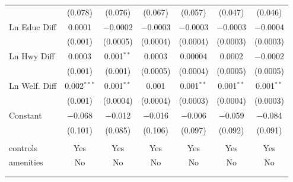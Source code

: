 \begin{table}[!htbp]
\begin{tabular}{@{\extracolsep{5pt}}lcccccc}
  & (0.078) & (0.076) & (0.067) & (0.057) & (0.047) & (0.046) \\ 
  Ln Educ Diff & 0.0001 & $-$0.0002 & $-$0.0003 & $-$0.0003 & $-$0.0003 & $-$0.0004 \\ 
  & (0.001) & (0.0005) & (0.0004) & (0.0004) & (0.0003) & (0.0003) \\ 
  Ln Hwy Diff & 0.0003 & 0.001$^{**}$ & 0.0003 & 0.00004 & 0.0002 & $-$0.0002 \\ 
  & (0.001) & (0.001) & (0.0005) & (0.0004) & (0.0005) & (0.0005) \\ 
  Ln Welf. Diff & 0.002$^{***}$ & 0.001$^{**}$ & 0.001 & 0.001$^{**}$ & 0.001$^{**}$ & 0.001$^{**}$ \\ 
  & (0.001) & (0.0004) & (0.0004) & (0.0003) & (0.0004) & (0.0003) \\ 
  Constant & $-$0.068 & $-$0.012 & $-$0.016 & $-$0.006 & $-$0.059 & $-$0.084 \\ 
  & (0.101) & (0.085) & (0.106) & (0.097) & (0.092) & (0.091) \\ 
 \hline \\[-1.8ex] 
controls & Yes & Yes & Yes & Yes & Yes & Yes \\ 
amenities & No & No & No & No & No & No \\ 
\hline \\[-1.8ex] 
\hline 
\hline \\[-1.8ex] 
\end{tabular} 
\end{table} 
